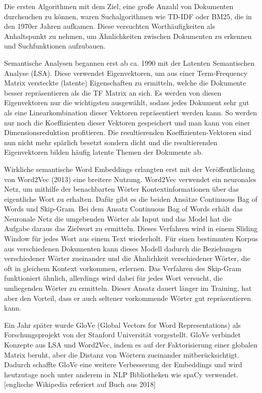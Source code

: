 Die ersten Algorithmen mit dem Ziel, eine große Anzahl von Dokumenten durchsuchen zu können, waren Suchalgorithmen wie TD-IDF oder BM25, die in den 1970er Jahren aufkamen.
Diese versuchten Worthäufigkeiten als Anhaltspunkt zu nehmen, um Ähnlichkeiten zwischen Dokumenten zu erkennen und Suchfunktionen aufzubauen. 

Semantische Analysen begannen erst ab ca. 1990 mit der Latenten Semantischen Analyse (LSA).
Diese verwendet Eigenvektoren, um aus einer Term-Frequency Matrix versteckte (latente) Eigenschaften zu ermitteln, welche die Dokumente besser repräsentieren als die TF Matrix an sich. 
Es werden von diesen Eigenvektoren nur die wichtigsten ausgewählt, sodass jedes Dokument sehr gut als eine Linearkombination dieser Vektoren repräsentiert werden kann.
So werden nur noch die Koeffizienten dieser Vektoren gespeichert und man kann von einer Dimensionsreduktion profitieren.
Die resultierenden Koeffizienten-Vektoren sind nun nicht mehr spärlich besetzt sondern dicht und die resultierenden Eigenvektoren bilden häufig latente Themen der Dokumente ab.

Wirkliche semantische Word Embeddings erlangten erst mit der Veröffentlichung von Word2Vec (2013) eine breitere Nutzung. 
Word2Vec verwendet ein neuronales Netz, um mithilfe der benachbarten Wörter Kontextinformationen über das eigentliche Wort zu erhalten. 
Dafür gibt es die beiden Ansätze Continuous Bag of Words und Skip-Gram.
Bei dem Ansatz Continuous Bag of Words erhält das Neuronale Netz die umgebenden Wörter als Input und das Model hat die Aufgabe daraus das Zielwort zu ermitteln. 
Dieses Verfahren wird in einem Sliding Window für jedes Wort aus einem Text wiederholt. 
Für einen bestimmten Korpus aus verschiedenen Dokumenten kann dieses Modell dadurch die Beziehungen verschiedener Wörter zueinander und die Ähnlichkeit verschiedener Wörter, die oft in gleichem Kontext vorkommen, erlernen. 
Das Verfahren des Skip-Gram funktioniert ähnlich, allerdings wird dabei für jedes Wort versucht, die umliegenden Wörter zu ermitteln. 
Dieser Ansatz dauert länger im Training, hat aber den Vorteil, dass er auch seltener vorkommende Wörter gut repräsentieren kann.

Ein Jahr später wurde GloVe (Global Vectors for Word Representations) als Forschungsprojekt von der Stanford Universität vorgestellt.
GloVe verbindet Konzepte aus LSA und Word2Vec, indem es auf der Faktorisierung einer globalen Matrix beruht, aber die Distanz von Wörtern zueinander mitberücksichtigt.
Dadurch schaffte GloVe eine weitere Verbesserung der Embeddings und wird heutzutage noch unter anderem in NLP Bibliotheken wie spaCy verwendet.[englische Wikipedia referiert auf Buch aus 2018]

